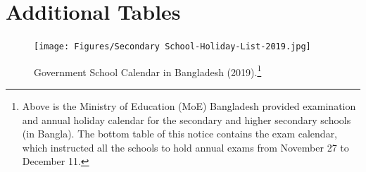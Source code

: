 \documentclass[12pt,letterpaper]{article}
\newcommand{\0}{\ensuremath{\mbox{\boldmath $0$}}}
\begin{document}
{\pagebreak


\section{Additional Tables\label{app_a4}}

\begin{figure}[ht!]
\centering
\texttt{[image: Figures/Secondary School-Holiday-List-2019.jpg]}\\
\caption{Government School Calendar in Bangladesh (2019).\footnote{Above is the Ministry of Education (MoE) Bangladesh provided examination and annual holiday calendar for the secondary and higher secondary schools (in Bangla). The bottom table of this notice contains the exam calendar, which instructed all the schools to hold annual exams from November 27 to December 11.}}
\label{school_calander_2019}
\end{figure}


\pagebreak

}
\end{document}
